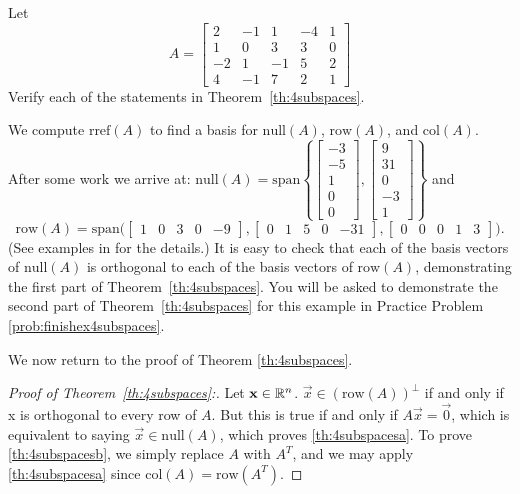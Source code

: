 \documentclass{ximera}
\begin{document}
\begin{example}\label{ex:4subspaces}
Let
$$A=\begin{bmatrix}2&-1&1&-4&1\\1&0&3&3&0\\-2&1&-1&5&2\\4&-1&7&2&1\end{bmatrix}$$
Verify each of the statements in Theorem~\ref{th:4subspaces}.

\begin{explanation}
 We compute $\mbox{rref}(A)$ to find a basis for   $\mbox{null}(A)$, $\mbox{row}(A)$, and $\mbox{col}(A)$.  After some work we arrive at:
 $\mbox{null}(A) = \mbox{span}\left\{\begin{bmatrix}-3\\-5\\1\\0\\0\end{bmatrix}, \begin{bmatrix}9\\31\\0\\-3\\1\end{bmatrix}\right\}$ 
 and
 $$\mbox{row}(A)=\mbox{span}\Big(\begin{bmatrix}1&0&3&0&-9\end{bmatrix},
\begin{bmatrix}0&1&5&0&-31\end{bmatrix},
\begin{bmatrix}0&0&0&1&3\end{bmatrix}\Big).$$  (See examples in  for the details.) It is easy to check that each of the basis vectors of $\mbox{null}(A)$ is orthogonal to each of the basis vectors of $\mbox{row}(A)$, demonstrating the first part of Theorem~\ref{th:4subspaces}.  You will be asked to demonstrate the second part of Theorem~\ref{th:4subspaces} for this example in Practice Problem \ref{prob:finishex4subspaces}.
\end{explanation}
\end{example}

We now return to the proof of Theorem \ref{th:4subspaces}.

\begin{proof}[Proof of Theorem~\ref{th:4subspaces}:]
Let $\mathbf{x}\in\mathbb{R}^n$.  $\vec{x}\in\left(\mbox{row}(A)\right)^\perp$ if and only if x is orthogonal to every row of $A$.  But this is true if and only if $A\vec{x}=\vec{0}$, which is equivalent to saying $\vec{x}\in\mbox{null}(A)$, which proves \ref{th:4subspacesa}.  To prove \ref{th:4subspacesb}, we simply replace $A$ with $A^T$, and we may apply \ref{th:4subspacesa} since $\mbox{col}(A) = \mbox{row}(A^T)$.
\end{proof}
\end{document}
